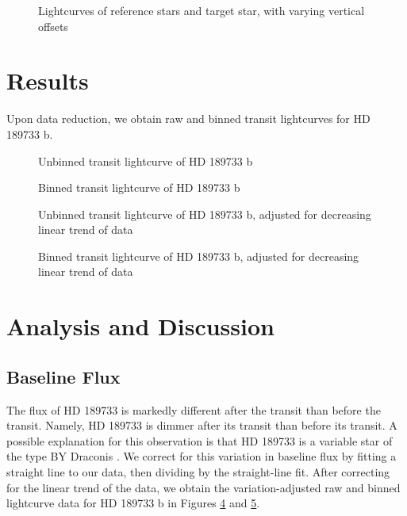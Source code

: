 \documentclass[twocolumn]{aastex631}
\begin{document}
\begin{figure}[ht!]
\caption{Lightcurves of reference stars and target star, with varying vertical offsets \label{fig:ref_lightcurve}}
\end{figure}

\section{Results} \label{sec:results}

Upon data reduction, we obtain raw and binned transit lightcurves for HD 189733 b.

\begin{figure}[htb!]
\caption{Unbinned transit lightcurve of HD 189733 b \label{fig:transit_lightcurve_all}}
\end{figure}

\begin{figure}[htb!]
\caption{Binned transit lightcurve of HD 189733 b \label{fig:transit_lightcurve_binned}}
\end{figure}

\begin{figure}[htb!]
\caption{Unbinned transit lightcurve of HD 189733 b, adjusted for decreasing linear trend of data \label{fig:transit_lightcurve_all_var}}
\end{figure}

\begin{figure}[htb!]
\caption{Binned transit lightcurve of HD 189733 b, adjusted for decreasing linear trend of data \label{fig:transit_lightcurve_binned_var}}
\end{figure}

\pagebreak

\section{Analysis and Discussion} \label{sec:analysis}

\subsection{Baseline Flux} \label{subsec:baseline_flux}

The flux of HD 189733 is markedly different after the transit than before the transit. Namely, HD 189733 is dimmer after its transit than before its transit. A possible explanation for this observation is that HD 189733 is a variable star of the type BY Draconis \citep{SIMBAD_HD189733}. We correct for this variation in baseline flux by fitting a straight line to our data, then dividing by the straight-line fit. After correcting for the linear trend of the data, we obtain the variation-adjusted raw and binned lightcurve data for HD 189733 b in Figures \ref{fig:transit_lightcurve_all_var} and \ref{fig:transit_lightcurve_binned_var}.
\end{document}
